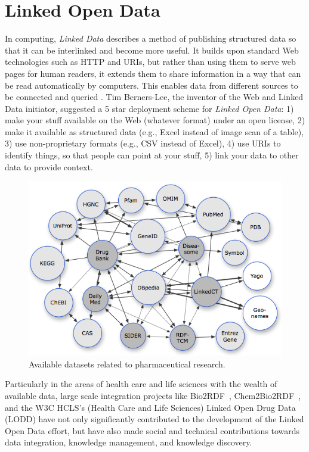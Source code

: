 \documentclass[conference]{IEEEtran}
\begin{document}
\section{Linked Open Data}
\label{sec:lod}
In computing, \emph{Linked Data} describes a method of publishing structured data so that it can be interlinked and become more useful.
It builds upon standard Web technologies such as HTTP and URIs, but rather than using them to serve web pages for human readers, it extends them to share information in a way that can be read automatically by computers.
This enables data from different sources to be connected and queried \cite{linkeddata}.
Tim Berners-Lee, the inventor of the Web and Linked Data initiator, suggested a 5 star deployment scheme for \emph{Linked Open Data}:
1) make your stuff available on the Web (whatever format) under an open license,
2) make it available as structured data (e.g., Excel instead of image scan of a table),
3) use non-proprietary formats (e.g., CSV instead of Excel),
4) use URIs to identify things, so that people can point at your stuff,
5) link your data to other data to provide context.

\begin{figure}[tb]
	\centering
		\includegraphics[width=1.0\columnwidth]{images/lod_cloud.png}
	\caption{Available datasets related to pharmaceutical research.}
	\label{fig:lod}
\end{figure}

Particularly in the areas of health care and life sciences with the wealth of available data, large scale integration projects like Bio2RDF~\cite{bio2rdf}, Chem2Bio2RDF~\cite{chembio}, and the W3C HCLS’s (Health Care and Life Sciences) Linked Open Drug Data (LODD)\cite{lodd} have not only significantly contributed to the development of the Linked Open Data effort, but have also made social and technical contributions towards data integration, knowledge management, and knowledge discovery.
\end{document}
